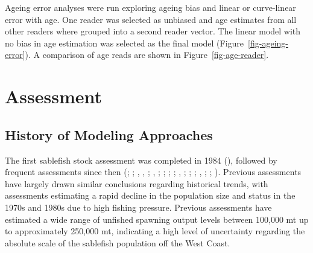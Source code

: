 \documentclass[
  english,
]{article}
\begin{document}
Ageing error analyses were run exploring ageing bias and linear or
curve-linear error with age. One reader was selected as unbiased and age
estimates from all other readers where grouped into a second reader
vector. The linear model with no bias in age estimation was selected as
the final model (Figure~\ref{fig-ageing-error}). A comparison of age
reads are shown in Figure~\ref{fig-age-reader}.

\newpage{}

\section{Assessment}\label{assessment}

\subsection{History of Modeling
Approaches}\label{history-of-modeling-approaches}

The first sablefish stock assessment was completed in 1984
(), followed by frequent
assessments since then (; ;
,
,
;
,
;
;
;
;
,
;
;
;
,
;
;
). Previous
assessments have largely drawn similar conclusions regarding historical
trends, with assessments estimating a rapid decline in the population
size and status in the 1970s and 1980s due to high fishing pressure.
Previous assessments have estimated a wide range of unfished spawning
output levels between 100,000 mt up to approximately 250,000 mt,
indicating a high level of uncertainty regarding the absolute scale of
the sablefish population off the West Coast.
\end{document}
